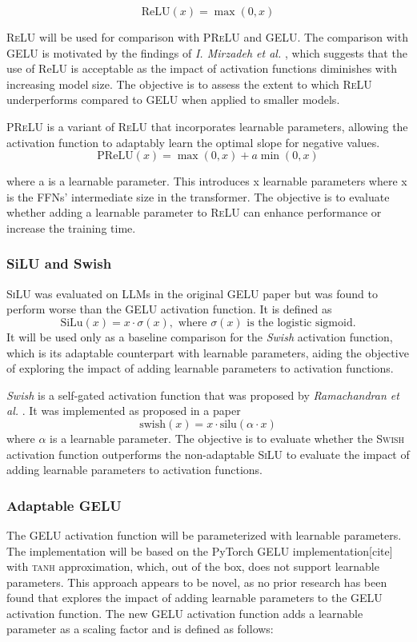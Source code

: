 \[
\text{ReLU}(x) = \max(0, x)
\]

\textsc{ReLU} will be used for comparison with \textsc{PReLU} and \textsc{GELU}. The comparison with \textsc{GELU} is motivated by the findings of \textit{I. Mirzadeh et al.} \cite{Mirzadeh2023}, which suggests that the use of ReLU is acceptable as the impact of activation functions diminishes with increasing model size. The objective is to assess the extent to which \textsc{ReLU} underperforms compared to \textsc{GELU} when applied to smaller models.

\textsc{PReLU} is a variant of \textsc{ReLU} that incorporates learnable parameters, allowing the activation function to adaptably learn the optimal slope for negative values.
\[
\text{PReLU}(x) = \max(0, x) + a \min(0, x)
\]

where a is a learnable parameter. This introduces x learnable parameters where x is the FFNs’ intermediate size in the transformer. The objective is to evaluate whether adding a learnable parameter to \textsc{ReLU} can enhance performance or increase the training time.

\subsubsection{SiLU and Swish}
\textsc{SiLU} was evaluated on LLMs in the original \textsc{GELU} paper \cite{Hendrycks2023} but was found to perform worse than the \textsc{GELU} activation function. It is defined as 
\[
\text{SiLu}(x) = x \cdot \sigma(x), \text{ where } \sigma(x) \text{ is the logistic sigmoid.}
\]
It will be used only as a baseline comparison for the \textit{Swish} activation function, which is its adaptable counterpart with learnable parameters, aiding the objective of exploring the impact of adding learnable parameters to activation functions. 

\textit{Swish} is a self-gated activation function that was proposed by \textit{Ramachandran et al.} \cite{Ramachandran2017}. It was implemented as proposed in a paper
\[
    \text{swish}(x) = x \cdot \text{silu}(\alpha \cdot x)
\]
where \(\alpha\) is a learnable parameter. The objective is to evaluate whether the \textsc{Swish} activation function outperforms the non-adaptable \textsc{SiLU} to evaluate the impact of adding learnable parameters to activation functions.

\subsubsection{Adaptable GELU}
The GELU activation function will be parameterized with learnable parameters. The implementation will be based on the PyTorch GELU implementation[cite] with \textsc{tanh} approximation, which, out of the box, does not support learnable parameters. This approach appears to be novel, as no prior research has been found that explores the impact of adding learnable parameters to the \textsc{GELU} activation function. The new \textsc{GELU} activation function adds a learnable parameter as a scaling factor and is defined as follows:

